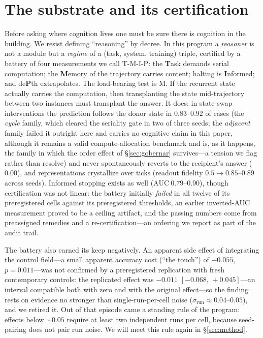 \documentclass{article}
\newcommand{\FtresARtoque}{$-0.011$} \newcommand{\FtresARIC}{$[-0.068,\,+0.045]$}
\begin{document}
\section{The substrate and its certification}\label{sec:pensar}

Before asking where cognition lives one must be sure there is cognition in
the building. We resist defining ``reasoning'' by decree. In this program a
\emph{reasoner} is not a module but a \emph{regime} of a
(task, system, training) triple, certified by a battery of four measurements
we call T-M-I-P: the \textbf{T}ask demands serial computation; the
\textbf{M}emory of the trajectory carries content; halting is
\textbf{I}nformed; and de\textbf{P}th extrapolates. The load-bearing
test is M. If the recurrent state actually carries the computation, then
transplanting the state mid-trajectory between two instances must transplant
the answer. It does: in state-swap interventions the prediction follows the
donor state in $0.83$--$0.92$ of cases (the \emph{cycle} family, which cleared
the seriality gate in two of three seeds; the \emph{adjacent} family failed it
outright here and carries no cognitive claim in this paper, although it
remains a valid compute-allocation benchmark and is, as it happens, the family
in which the order effect of \S\ref{sec:gobernar} survives---a tension we flag
rather than resolve) and never spontaneously
reverts to the recipient's answer ($0.00$),
and representations crystallize over ticks (readout fidelity $0.5 \to
0.85$--$0.89$ across seeds).
Informed stopping exists as well ($\mathrm{AUC}\ 0.79$--$0.90$), though
certification was not linear: the battery initially \emph{failed} in all
twelve of its preregistered cells against
its preregistered thresholds, an earlier inverted-AUC measurement proved
to be a ceiling artifact, and the passing numbers come from preassigned
remedies and a re-certification---an ordering we report as part of the
audit trail.

The battery also earned its keep negatively. An apparent side effect of
integrating the control field---a small apparent accuracy cost (``the
touch'') of $-0.055$, $p=0.011$---was not confirmed by a preregistered
replication with fresh contemporary controls: the replicated effect was
\FtresARtoque{} \FtresARIC{}---an interval compatible both with zero and
with the original effect---so the finding rests on evidence no stronger
than single-run-per-cell noise ($\sigma_{\mathrm{run}}\approx
0.04$--$0.05$), and we retired it. Out of that episode came a standing
rule of the program: effects below ${\sim}0.05$ require at least two
independent runs per cell, because seed-pairing does not pair run noise. We
will meet this rule again in \S\ref{sec:method}.
\end{document}
